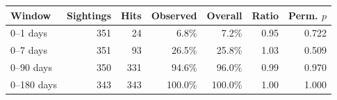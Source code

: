 \small
\begin{tabular}{@{}lrrrrrr@{}}
\toprule
Window & Sightings & Hits & Observed & Overall & Ratio & Perm. $p$ \\
\midrule
0--1 days & 351 & 24 & 6.8\% & 7.2\% & 0.95 & 0.722 \\
0--7 days & 351 & 93 & 26.5\% & 25.8\% & 1.03 & 0.509 \\
0--90 days & 350 & 331 & 94.6\% & 96.0\% & 0.99 & 0.970 \\
0--180 days & 343 & 343 & 100.0\% & 100.0\% & 1.00 & 1.000 \\
\bottomrule
\end{tabular}
